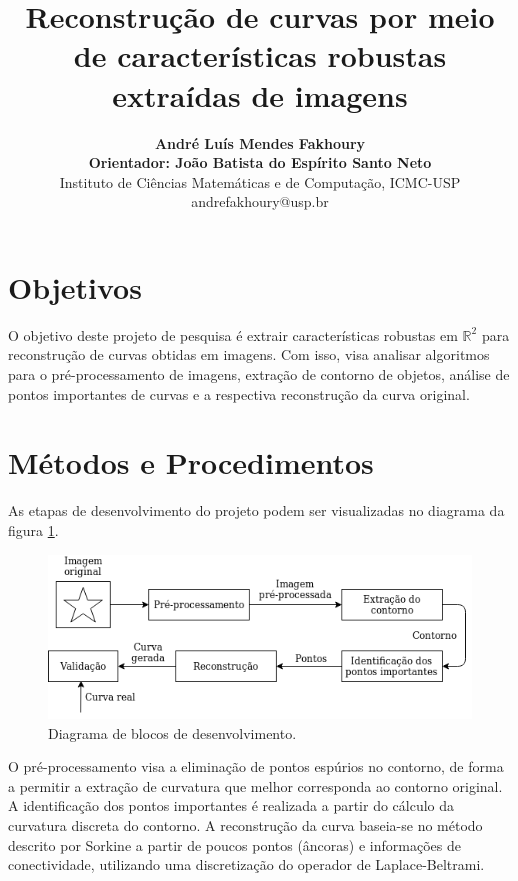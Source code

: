 \documentclass[a4paper,10pt,twocolumn]{article}
\begin{document}
	\title{\large{\vspace{-1cm}\textbf{Reconstrução de curvas por meio de características robustas extraídas de imagens}}}
	\author{\textbf{André Luís Mendes Fakhoury}\vspace{0.2cm}\\
		\textbf{Orientador: João Batista do Espírito Santo Neto}\vspace{0.2cm}\\
		Instituto de Ciências Matemáticas e de Computação, ICMC-USP\\
		\normalsize{andrefakhoury@usp.br \quad }}
	
	\date{\null}
	\maketitle
	
	\thispagestyle{fancy}
	
	\section*{\hfil Objetivos}
	
	O objetivo deste projeto de pesquisa é extrair características robustas em $\mathbb{R}^2$ para reconstrução de curvas obtidas em imagens. Com isso, visa analisar algoritmos para o pré-processamento de imagens, extração de contorno de objetos, análise de pontos importantes de curvas e a respectiva reconstrução da curva original.
	
	\section*{\hfil Métodos e Procedimentos}
	As etapas de desenvolvimento do projeto podem ser visualizadas no diagrama da figura \ref{fig:diagrama}.
	\begin{figure}[ht!]
	\centering
	\includegraphics[width=0.85\linewidth]{imagens/diagrama.png}
	\caption{Diagrama de blocos de desenvolvimento.}
	\label{fig:diagrama}
	\end{figure}
	O pré-processamento visa a eliminação de pontos espúrios no contorno, de forma a permitir a extração de curvatura que melhor corresponda ao contorno original. A identificação dos pontos importantes é realizada a partir do cálculo da curvatura discreta do contorno. A reconstrução da curva baseia-se no método descrito por Sorkine \cite{sorkine} a partir de poucos pontos (âncoras) e informações de conectividade, utilizando uma discretização do operador de Laplace-Beltrami.
	
\end{document}
